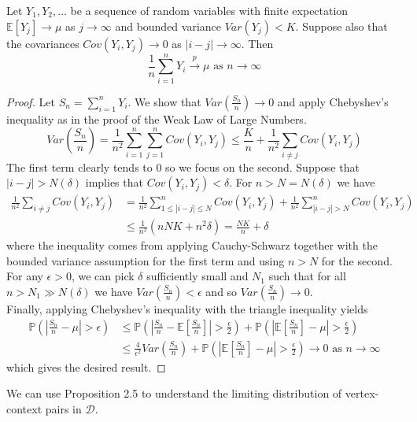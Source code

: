 \documentclass[a4paper]{article}
\renewcommand{\P}{\mathbb P}
\renewcommand{\E}{\mathbb E}
\newcommand{\D}{\mathcal D}
\begin{document}
\begin{proposition}
  Let $Y_1,Y_2, \dots$ be a sequence of random variables with finite expectation $\E[Y_j] \to \mu$ as $j \to \infty$ and bounded variance $Var(Y_j) < K$. Suppose also that the covariances $Cov(Y_i, Y_j) \to 0$ as $|i-j| \to \infty$. Then
  \[\frac{1}{n}\sum_{i = 1}^n Y_i \overset{p}{\longrightarrow} \mu \text{ as } n \to \infty\]
\end{proposition}
\begin{proof}
  Let $S_n = \sum_{i=1}^n Y_i$. We show that $Var\left(\frac{S_n}{n}\right) \to 0$ and apply Chebyshev's inequality as in the proof of the Weak Law of Large Numbers.\\
  \[Var\left(\frac{S_n}{n}\right) = \frac{1}{n^2} \sum_{i=1}^n\sum_{j=1}^n Cov(Y_i, Y_j) \leq \frac{K}{n} + \frac{1}{n^2}\sum_{i \neq j}Cov(Y_i, Y_j)\]
  The first term clearly tends to 0 so we focus on the second. Suppose that $|i-j| > N(\delta)$ implies that $Cov(Y_i, Y_j) < \delta$. For $n > N = N(\delta)$ we have
  \begin{align*}
    \frac{1}{n^2}\sum_{i \neq j}Cov(Y_i, Y_j)&=\frac{1}{n^2}\sum_{1 \leq |i-j| \leq N}^n Cov(Y_i, Y_j) + \frac{1}{n^2}\sum_{|i-j| > N}^n Cov(Y_i, Y_j)\\
    &\leq \frac{1}{n^2}\left(nNK + n^2\delta\right) = \frac{NK}{n} + \delta
  \end{align*}
  where the inequality comes from applying Cauchy-Schwarz together with the bounded variance assumption for the first term and using $n > N$ for the second. For any $\epsilon > 0$, we can pick $\delta$ sufficiently small and $N_1$ such that for all $n > N_1 \gg N(\delta)$ we have $Var\left(\frac{S_n}{n}\right) < \epsilon$ and so $Var\left(\frac{S_n}{n}\right) \to 0$.\\
  Finally, applying Chebyshev's inequality with the triangle inequality yields
  \begin{align*}
  \P\left(\left| \frac{S_n}{n} - \mu\right| > \epsilon \right) &\leq \P\left(\left| \frac{S_n}{n} - \E\left[\frac{S_n}{n}\right]\right| > \frac{\epsilon}{2} \right) + \P\left(\left| \E\left[\frac{S_n}{n}\right] - \mu\right| > \frac{\epsilon}{2} \right)\\
  &\leq \frac{4}{\epsilon^2}Var\left(\frac{S_n}{n}\right) + \P\left(\left| \E\left[\frac{S_n}{n}\right] - \mu\right| > \frac{\epsilon}{2} \right) \to 0 \text{ as } n \to \infty
\end{align*}
  which gives the desired result.
\end{proof}
We can use Proposition 2.5 to understand the limiting distribution of vertex-context pairs in $\D$.
\end{document}
